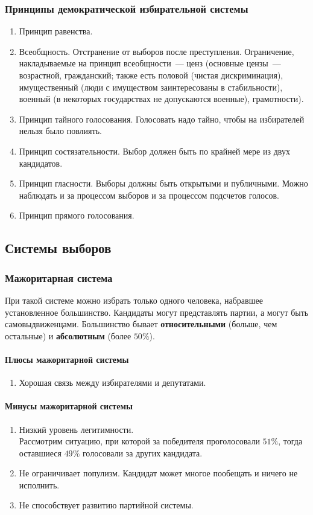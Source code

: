 \documentclass[12pt]{article}
\begin{document}
	\subsubsection{Принципы демократической избирательной системы}
	\begin{enumerate}
		\item Принцип равенства.
		\item Всеобщность. Отстранение от выборов после преступления. Ограничение, накладываемые на принцип всеобщности~--- ценз (основные цензы~--- возрастной, гражданский; также есть половой (чистая дискриминация), имущественный (люди с имуществом заинтересованы в стабильности), военный (в некоторых государствах не допускаются военные), грамотности).
		\item Принцип тайного голосования. Голосовать надо тайно, чтобы на избирателей нельзя было повлиять.
		\item Принцип состязательности. Выбор должен быть по крайней мере из двух кандидатов.
		\item Принцип гласности. Выборы должны быть открытыми и публичными. Можно наблюдать и за процессом выборов и за процессом подсчетов голосов.
		\item Принцип прямого голосования.
	\end{enumerate}
	\subsection{Системы выборов}
	\subsubsection{Мажоритарная система}
	\begin{definition}
		При такой системе можно избрать только одного человека, набравшее установленное большинство. Кандидаты могут представлять партии, а могут быть самовыдвиженцами. Большинство бывает \textbf{относительными} (больше, чем остальные) и \textbf{абсолютным} (более $50 \%$).
	\end{definition}
	\paragraph{Плюсы мажоритарной системы}
	\begin{enumerate}
		\item Хорошая связь между избирателями и депутатами.
	\end{enumerate}
	\paragraph{Минусы мажоритарной системы}
	\begin{enumerate}
		\item Низкий уровень легитимности.\\Рассмотрим ситуацию, при которой за победителя проголосовали  $51\%$, тогда оставшиеся $49\%$ голосовали за других кандидата.
		\item Не ограничивает популизм. Кандидат может многое пообещать и ничего не исполнить.
		\item Не способствует развитию партийной системы.
	\end{enumerate}
\end{document}
